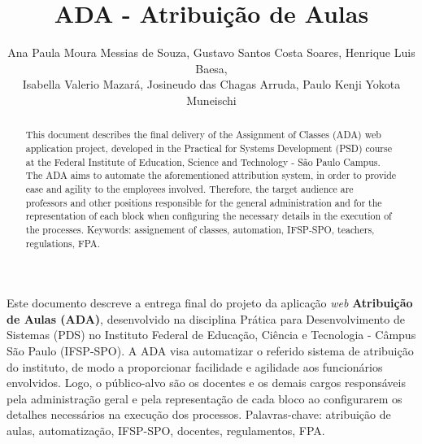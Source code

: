 \documentclass[12pt]{article}
\title{ADA - Atribuição de Aulas}
\author{Ana Paula Moura Messias de Souza, Gustavo Santos Costa Soares, Henrique Luis Baesa, 
\\Isabella Valerio Mazará, Josineudo das Chagas Arruda, Paulo Kenji Yokota Muneischi}
\begin{document}
 

\maketitle

\begin{abstract}
  This document describes the final delivery of the Assignment of Classes (ADA) web application project, developed in the Practical for Systems Development (PSD) course at the Federal Institute of Education, Science and Technology - São Paulo Campus. The ADA aims to automate the aforementioned attribution system, in order to provide ease and agility to the employees involved. Therefore, the target audience are professors and other positions responsible for the general administration and for the representation of each block when configuring the necessary details in the execution of the processes. Keywords: assignement of classes, automation, IFSP-SPO, teachers, regulations, FPA.
\end{abstract}
     
\begin{resumo} 
  Este documento descreve a entrega final do projeto da aplicação \textit{web} \textbf{Atribuição de Aulas (ADA)}, desenvolvido na disciplina Prática para Desenvolvimento de Sistemas (PDS) no Instituto Federal de Educação, Ciência e Tecnologia - Câmpus São Paulo (IFSP-SPO). A ADA visa automatizar o referido sistema de atribuição do instituto, de modo a proporcionar facilidade e agilidade aos funcionários envolvidos. Logo, o público-alvo são os docentes e os demais cargos responsáveis pela administração geral e pela representação de cada bloco ao configurarem os detalhes necessários na execução dos processos. Palavras-chave: atribuição de aulas, automatização, IFSP-SPO, docentes, regulamentos, FPA.
\end{resumo}
\end{document}
